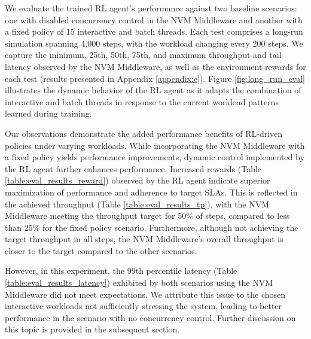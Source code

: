 We evaluate the trained RL agent's performance against two baseline scenarios: one with disabled concurrency control in the NVM Middleware and another with a fixed policy of 15 interactive and batch threads. Each test comprises a long-run simulation spanning 4,000 steps, with the workload changing every 200 steps. We capture the minimum, 25th, 50th, 75th, and maximum throughput and tail latency observed by the NVM Middleware, as well as the environment rewards for each test (results presented in Appendix \ref{appendix:e}). Figure \ref{fig:long_run_eval} illustrates the dynamic behavior of the RL agent as it adapts the combination of interactive and batch threads in response to the current workload patterns learned during training.

Our observations demonstrate the added performance benefits of RL-driven policies under varying workloads. While incorporating the NVM Middleware with a fixed policy yields performance improvements, dynamic control implemented by the RL agent further enhances performance. Increased rewards (Table \ref{table:eval_results_reward}) observed by the RL agent indicate superior maximization of performance and adherence to target SLAs. This is reflected in the achieved throughput (Table \ref{table:eval_results_tp}), with the NVM Middleware meeting the throughput target for 50\% of steps, compared to less than 25\% for the fixed policy scenario. Furthermore, although not achieving the target throughput in all steps, the NVM Middleware's overall throughput is closer to the target compared to the other scenarios.

However, in this experiment, the 99th percentile latency (Table \ref{table:eval_results_latency}) exhibited by both scenarios using the NVM Middleware did not meet expectations. We attribute this issue to the chosen interactive workloads not sufficiently stressing the system, leading to better performance in the scenario with no concurrency control. Further discussion on this topic is provided in the subsequent section.




